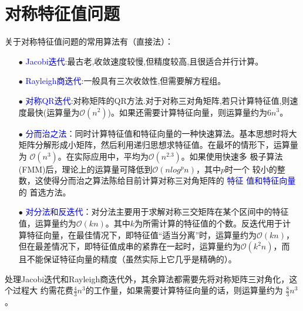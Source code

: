 \documentclass[12pt,a4paper]{article}
\begin{document}
\section{对称特征值问题}
关于对称特征值问题的常用算法有（直接法）：
\begin{itemize}
    \item[$\bullet$] \textcolor{blue}{Jacobi迭代}:最古老,收敛速度较慢,但精度较高,且很适合并行计算。
\item[$\bullet$] \textcolor{blue}{Rayleigh商迭代}:一般具有三次收敛性,但需要解方程组。
\item[$\bullet$] \textcolor{blue}{对称QR迭代}:对称矩阵的QR方法.对于对称三对角矩阵,若只计算特征值,则速
度最快(运算量为$\mathcal O(n^2)$)。如果还需要计算特征向量，则运算量约为$6n^3$。
\item[$\bullet$] \textcolor{blue}{分而治之法}：同时计算特征值和特征向量的一种快速算法。基本思想时将大
    矩阵分解形成小矩阵，然后利用递归思想求特征值。在最坏的情形下，运算量为
    $\mathcal O(n^3)$。在实际应用中，平均为$\mathcal O(n^{2.3})$。如果使用快速多
    极子算法(FMM)后，理论上的运算量可降低到$\mathcal O(nlog^p n)$，其中$p$时一个
    较小的整数，这使得分而治之算法陈给目前计算对称三对角矩阵的 \textcolor{blue}{特征
    值和特征向量}的
    首选方法。
\item[$\bullet$] \textcolor{blue}{对分法和反迭代}：对分法主要用于求解对称三交矩阵在某个区间中的特征
    值，运算量约为$\mathcal O(kn)$。其中$k$为所需计算的特征值的个数。反迭代用于计
    算特征向量，在最佳情况下，即特征值“适当分离”时，运算量约为$\mathcal O(kn)$，
    但在最差情况下，即特征值成串的紧靠在一起时，运算量约为$\mathcal O(k^2n)$，而
    且不能保证特征向量的精度（虽然实际上它几乎是精确的）。
\end{itemize}

处理Jacobi迭代和Rayleigh商迭代外，其余算法都需要先将对称矩阵三对角化，这个过程大
约需花费$\frac{4}{3} n^3$的工作量，如果需要计算特征向量的话，则运算量约为
$\frac{8}{3}n^3$。
\end{document}
